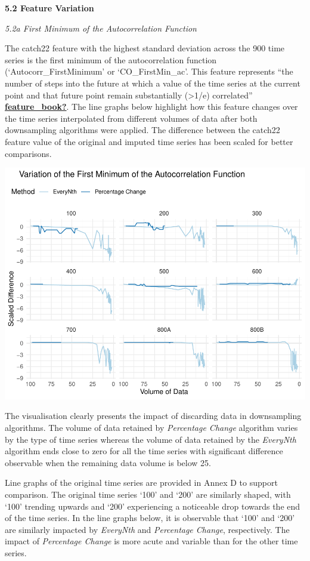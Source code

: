 \documentclass{article}
\begin{document}
\textbf{5.2 Feature Variation}

\emph{5.2a First Minimum of the Autocorrelation Function}

The catch22 feature with the highest standard deviation across the 900
time series is the first minimum of the autocorrelation function
(`Autocorr\_FirstMinimum' or `CO\_FirstMin\_ac'. This feature represents
``the number of steps into the future at which a value of the time
series at the current point and that future point remain substantially
(\textgreater1/e) correlated''
\protect\hyperlink{ref-feature_book}{\textbf{feature\_book?}}. The line
graphs below highlight how this feature changes over the time series
interpolated from different volumes of data after both downsampling
algorithms were applied. The difference between the catch22 feature
value of the original and imputed time series has been scaled for better
comparisons.

\includegraphics{210431461_CSC8639_Dissertation_files/figure-latex/FirstMinimum-1.pdf}

The visualisation clearly presents the impact of discarding data in
downsampling algorithms. The volume of data retained by \emph{Percentage
Change} algorithm varies by the type of time series whereas the volume
of data retained by the \emph{EveryNth} algorithm ends close to zero for
all the time series with significant difference observable when the
remaining data volume is below 25.

Line graphs of the original time series are provided in Annex D to
support comparison. The original time series `100' and `200' are
similarly shaped, with `100' trending upwards and `200' experiencing a
noticeable drop towards the end of the time series. In the line graphs
below, it is observable that `100' and `200' are similarly impacted by
\emph{EveryNth} and \emph{Percentage Change}, respectively. The impact
of \emph{Percentage Change} is more acute and variable than for the
other time series.
\end{document}
